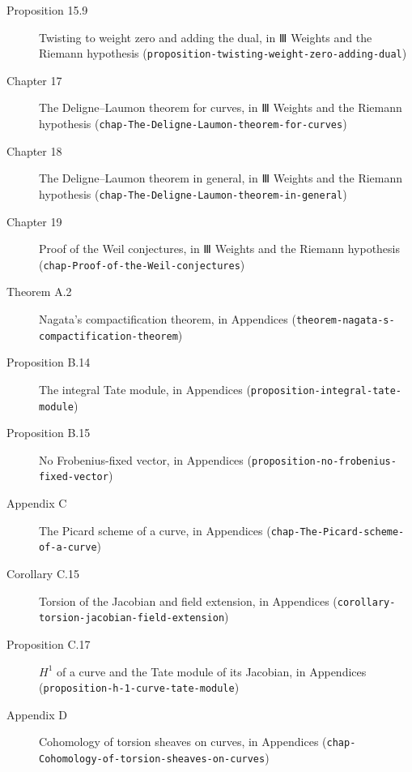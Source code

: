 \documentclass[11pt]{article}
\newcommand{\bpslug}[1]{\texttt{#1}}
\begin{document}
\begin{description}
\item[Proposition 15.9] Twisting to weight zero and adding the dual, in Ⅲ Weights and the Riemann hypothesis (\bpslug{proposition-{}\allowbreak{}twisting-{}\allowbreak{}weight-{}\allowbreak{}zero-{}\allowbreak{}adding-{}\allowbreak{}dual})
\item[Chapter 17] The Deligne–Laumon theorem for curves, in Ⅲ Weights and the Riemann hypothesis (\bpslug{chap-{}\allowbreak{}The-{}\allowbreak{}Deligne-{}\allowbreak{}Laumon-{}\allowbreak{}theorem-{}\allowbreak{}for-{}\allowbreak{}curves})
\item[Chapter 18] The Deligne–Laumon theorem in general, in Ⅲ Weights and the Riemann hypothesis (\bpslug{chap-{}\allowbreak{}The-{}\allowbreak{}Deligne-{}\allowbreak{}Laumon-{}\allowbreak{}theorem-{}\allowbreak{}in-{}\allowbreak{}general})
\item[Chapter 19] Proof of the Weil conjectures, in Ⅲ Weights and the Riemann hypothesis (\bpslug{chap-{}\allowbreak{}Proof-{}\allowbreak{}of-{}\allowbreak{}the-{}\allowbreak{}Weil-{}\allowbreak{}conjectures})
\item[Theorem A.2] Nagata's compactification theorem, in Appendices (\bpslug{theorem-{}\allowbreak{}nagata-{}\allowbreak{}s-{}\allowbreak{}compactification-{}\allowbreak{}theorem})
\item[Proposition B.14] The integral Tate module, in Appendices (\bpslug{proposition-{}\allowbreak{}integral-{}\allowbreak{}tate-{}\allowbreak{}module})
\item[Proposition B.15] No Frobenius-fixed vector, in Appendices (\bpslug{proposition-{}\allowbreak{}no-{}\allowbreak{}frobenius-{}\allowbreak{}fixed-{}\allowbreak{}vector})
\item[Appendix C] The Picard scheme of a curve, in Appendices (\bpslug{chap-{}\allowbreak{}The-{}\allowbreak{}Picard-{}\allowbreak{}scheme-{}\allowbreak{}of-{}\allowbreak{}a-{}\allowbreak{}curve})
\item[Corollary C.15] Torsion of the Jacobian and field extension, in Appendices (\bpslug{corollary-{}\allowbreak{}torsion-{}\allowbreak{}jacobian-{}\allowbreak{}field-{}\allowbreak{}extension})
\item[Proposition C.17] $H^1$ of a curve and the Tate module of its Jacobian, in Appendices (\bpslug{proposition-{}\allowbreak{}h-{}\allowbreak{}1-{}\allowbreak{}curve-{}\allowbreak{}tate-{}\allowbreak{}module})
\item[Appendix D] Cohomology of torsion sheaves on curves, in Appendices (\bpslug{chap-{}\allowbreak{}Cohomology-{}\allowbreak{}of-{}\allowbreak{}torsion-{}\allowbreak{}sheaves-{}\allowbreak{}on-{}\allowbreak{}curves})

\end{description}
\end{document}
